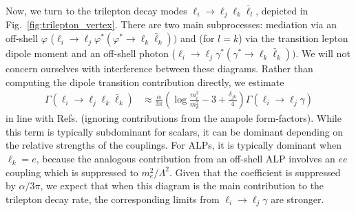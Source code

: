 {Now, we turn to the trilepton decay modes $\ell_i \rightarrow \ell_j \ell_k\bar{\ell}_l$, depicted in Fig.~\ref{fig:trilepton_vertex}. There are two main subprocesses: mediation via an off-shell $\varphi$ ($\ell_i\rightarrow\ell_j\varphi^*(\varphi^*\rightarrow \ell_k\bar{\ell}_k))$ and (for $l = k$) via the transition lepton dipole moment and an off-shell photon ($\ell_i \rightarrow \ell_j\gamma^*(\gamma^*\rightarrow \ell_k \bar{\ell}_k))$. We will not concern ourselves with interference between these diagrams. Rather than computing the dipole transition contribution directly, we estimate
\begin{align}
    \Gamma(\ell_i \longrightarrow \ell_j \ell_k\bar{\ell}_k) &\approx \frac{\alpha}{3\pi}\left(\log\frac{m_i^2}{m_k^2}-3 + \frac{\delta_{jk}}{4}\right)\Gamma(\ell_i \rightarrow \ell_j \gamma)
\end{align}
in line with Refs. \cite{Abada:2014kba, Cornella:2019uxs} (ignoring contributions from the anapole form-factors). While this term is typically subdominant for scalars, it can be dominant depending on the relative strengths of the couplings. For ALPs, it is typically dominant when $\ell_k = e$, because the analogous contribution from an off-shell ALP involves an $ee$ coupling which is suppressed to $m_e^2/\Lambda^2$. Given that the coefficient is suppressed by $\alpha/3\pi$, we expect that when this diagram is the main contribution to the trilepton decay rate, the corresponding limits from $\ell_i\rightarrow\ell_j\gamma$ are stronger.

}
